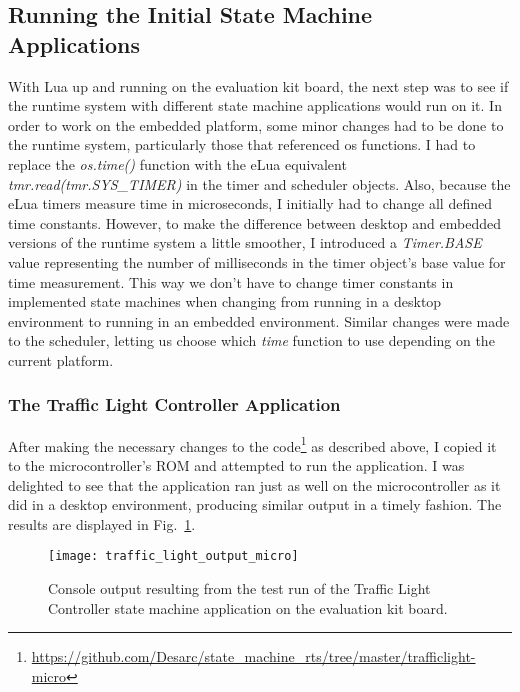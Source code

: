 \subsection{Running the Initial State Machine Applications}
\label{sec:running_initial}
With Lua up and running on the evaluation kit board, the next step was to see if the runtime system with different state machine applications would run on it. In order to work on the embedded platform, some minor changes had to be done to the runtime system, particularly those that referenced \gls{os} functions. I had to replace the \emph{os.time()} function with the eLua equivalent \emph{tmr.read(tmr.SYS\_TIMER)} in the timer and scheduler objects. Also, because the eLua timers measure time in microseconds, I initially had to change all defined time constants. However, to make the difference between desktop and embedded versions of the runtime system a little smoother, I introduced a \emph{Timer.BASE} value representing the number of milliseconds in the timer object's base value for time measurement. This way we don't have to change timer constants in implemented state machines when changing from running in a desktop environment to running in an embedded environment. Similar changes were made to the scheduler, letting us choose which \emph{time} function to use depending on the current platform.

\subsubsection{The Traffic Light Controller Application}
After making the necessary changes to the code\footnote{\url{https://github.com/Desarc/state_machine_rts/tree/master/trafficlight-micro}} as described above, I copied it to the microcontroller's ROM and attempted to run the application. I was delighted to see that the application ran just as well on the microcontroller as it did in a desktop environment, producing similar output in a timely fashion. The results are displayed in Fig.~\ref{fig:traffic_light_output_micro}.

\begin{figure}[htp]
	\centering
	\texttt{[image: traffic\_light\_output\_micro]}
	\caption[Output of Traffic Light Controller test run (microcontroller)]{Console output resulting from the test run of the Traffic Light Controller state machine application on the evaluation kit board.}
	\label{fig:traffic_light_output_micro}
\end{figure}


